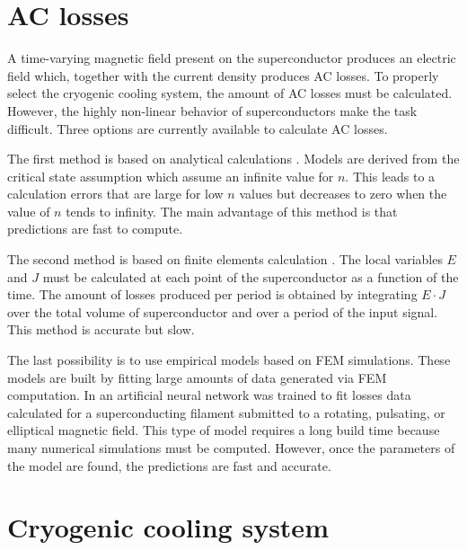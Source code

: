 \documentclass{ws-jmrr}
\begin{document}
\begin{multicols}{2}
\section{AC losses}
\label{ac}
A time-varying magnetic field present on the superconductor produces an electric field which, together with the current density produces AC losses. To properly select the cryogenic cooling system, the amount of AC losses must be calculated. However, the highly non-linear behavior of superconductors make the task difficult. Three options are currently available to calculate AC losses.\par
The first method is based on analytical calculations \cite{0022-3727-3-4-308}. Models are derived from the critical state assumption which assume an infinite value for $n$. This leads to a calculation errors that are large for low $n$ values but decreases to zero when the value of $n$ tends to infinity. The main advantage of this method is that predictions are fast to compute.\par
The second method is based on finite elements calculation \cite{brambilla2006development}. The local variables $E$ and $J$ must be calculated at each point of the superconductor as a function of the time. The amount of losses produced per period is obtained by integrating $E\cdot J$ over the total volume of superconductor and over a period of the input signal. This method is accurate but slow.\par
The last possibility is to use empirical models based on FEM simulations. These models are built by fitting large amounts of data generated via FEM computation. In \cite{leclerc2016artificial} an artificial neural network was trained to fit losses data calculated for a superconducting filament submitted to a rotating, pulsating, or elliptical magnetic field. This type of model requires a long build time because many numerical simulations must be computed. However, once the parameters of the model are found, the predictions are fast and accurate.

\section{Cryogenic cooling system}


\end{multicols}
\end{document}
